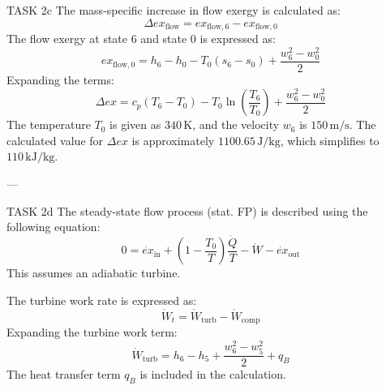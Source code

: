 TASK 2c  
The mass-specific increase in flow exergy is calculated as:  
\[
\Delta ex_{\text{flow}} = ex_{\text{flow},6} - ex_{\text{flow},0}
\]  
The flow exergy at state 6 and state 0 is expressed as:  
\[
ex_{\text{flow},0} = h_6 - h_0 - T_0(s_6 - s_0) + \frac{w_6^2 - w_0^2}{2}
\]  
Expanding the terms:  
\[
\Delta ex = c_p(T_6 - T_0) - T_0 \ln \left( \frac{T_6}{T_0} \right) + \frac{w_6^2 - w_0^2}{2}
\]  
The temperature \( T_0 \) is given as \( 340 \, \text{K} \), and the velocity \( w_6 \) is \( 150 \, \text{m/s} \).  
The calculated value for \( \Delta ex \) is approximately \( 1100.65 \, \text{J/kg} \), which simplifies to \( 110 \, \text{kJ/kg} \).  

---

TASK 2d  
The steady-state flow process (stat. FP) is described using the following equation:  
\[
0 = \dot{ex}_{\text{in}} + \left( 1 - \frac{T_0}{T} \right) \frac{\dot{Q}}{T} - \dot{W} - \dot{ex}_{\text{out}}
\]  
This assumes an adiabatic turbine.  

The turbine work rate is expressed as:  
\[
\dot{W}_t = \dot{W}_{\text{turb}} - \dot{W}_{\text{comp}}
\]  
Expanding the turbine work term:  
\[
\dot{W}_{\text{turb}} = h_6 - h_5 + \frac{w_6^2 - w_5^2}{2} + q_B
\]  
The heat transfer term \( q_B \) is included in the calculation.  

